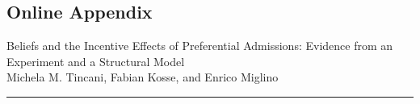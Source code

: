 \documentclass[english,letterpaper,12pt]{article}
\begin{document}
\begin{onehalfspacing}
    


\renewcommand{\thetable}{R\arabic{table}}
\renewcommand{\thefigure}{R\arabic{figure}}
\newpage 
\setcounter{footnote}{0} 
\setcounter{table}{0}




	
	\setlength{\bibhang}{0.75cm}
	\setlength{\bibsep}{0.035cm}
	\begin{singlespacing}
		
	\end{singlespacing}
	
	\setcounter{table}{0}
	\renewcommand{\thetable}{A\arabic{table}}
	
	\setcounter{figure}{0}
	\renewcommand{\thefigure}{A\arabic{figure}}
	
	\clearpage
	\renewcommand*{\thepage}{A\arabic{page}}

	    


	\begin{appendix}		
		\newpage
		
		
	
		
		
		\section*{\hspace{5cm}Online Appendix}
		\begin{center}
			\vspace{.7cm}
			
		
   {\Large {Beliefs and the Incentive Effects of Preferential Admissions: Evidence from an Experiment and a Structural Model}} \\[0.5cm]
			
			{\large Michela M. Tincani, Fabian Kosse, and Enrico Miglino}
			
			\vspace{0.5cm}
			\date{\today}
		\end{center}
		
		\vspace{1cm}
		
		
		\hrule
		
		\vspace{1cm}
		
		
	
	
	
    	
    
  

\end{appendix}
\end{onehalfspacing}
\end{document}
